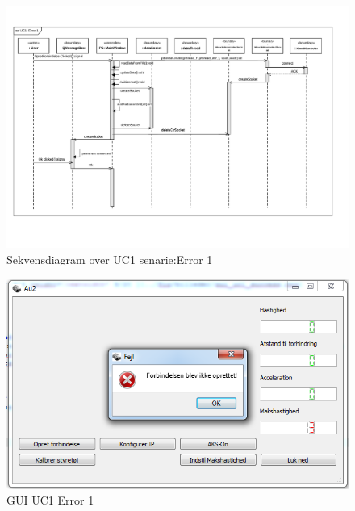 \begin{figure}[H]
\centering
\includegraphics[width=\textwidth* 1,height=\textwidth* 7/10 ]{../fig/diagrammer/pc/sd_uc1_Error_1.pdf}
\caption{Sekvensdiagram over UC1 senarie:Error 1}
\label{fig:cd_uc1_error_1}
\end{figure}

\begin{figure}[H]
\centering
\includegraphics[width=\textwidth* 3/4,height=\textwidth* 9/20 ]{../fig/billeder/gui_uc1_error_1.png}
\caption{GUI UC1 Error 1}
\label{fig:GUI_uc1_error_1}
\end{figure}

